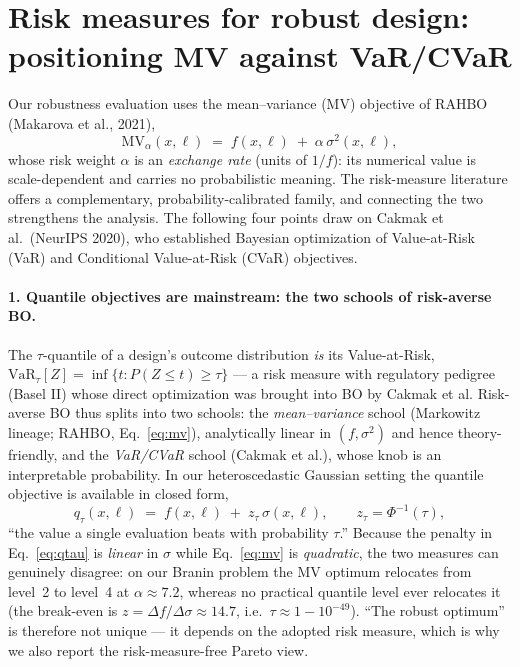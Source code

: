 \section*{Risk measures for robust design: positioning MV against VaR/CVaR}

Our robustness evaluation uses the mean--variance (MV) objective of RAHBO
(Makarova et al., 2021),
\begin{equation}
  \mathrm{MV}_{\alpha}(x,\ell) \;=\; f(x,\ell) \;+\; \alpha\,\sigma^{2}(x,\ell),
  \label{eq:mv}
\end{equation}
whose risk weight $\alpha$ is an \emph{exchange rate} (units of $1/f$): its numerical value is
scale-dependent and carries no probabilistic meaning. The risk-measure literature offers a
complementary, probability-calibrated family, and connecting the two strengthens the analysis.
The following four points draw on Cakmak et al.\ (NeurIPS 2020), who established Bayesian
optimization of Value-at-Risk (VaR) and Conditional Value-at-Risk (CVaR) objectives.

\paragraph{1. Quantile objectives are mainstream: the two schools of risk-averse BO.}
The $\tau$-quantile of a design's outcome distribution \emph{is} its Value-at-Risk,
$\mathrm{VaR}_{\tau}[Z] = \inf\{t : P(Z \le t) \ge \tau\}$ — a risk measure with regulatory
pedigree (Basel II) whose direct optimization was brought into BO by Cakmak et al.
Risk-averse BO thus splits into two schools: the \emph{mean--variance} school
(Markowitz lineage; RAHBO, Eq.~\ref{eq:mv}), analytically linear in $(f,\sigma^{2})$ and hence
theory-friendly, and the \emph{VaR/CVaR} school (Cakmak et al.), whose knob is an interpretable
probability. In our heteroscedastic Gaussian setting the quantile objective is available in
closed form,
\begin{equation}
  q_{\tau}(x,\ell) \;=\; f(x,\ell) \;+\; z_{\tau}\,\sigma(x,\ell),
  \qquad z_{\tau} = \Phi^{-1}(\tau),
  \label{eq:qtau}
\end{equation}
``the value a single evaluation beats with probability $\tau$.'' Because the penalty in
Eq.~\eqref{eq:qtau} is \emph{linear} in $\sigma$ while Eq.~\eqref{eq:mv} is \emph{quadratic},
the two measures can genuinely disagree: on our Branin problem the MV optimum relocates from
level~2 to level~4 at $\alpha \approx 7.2$, whereas no practical quantile level ever relocates it
(the break-even is $z = \Delta f / \Delta\sigma \approx 14.7$, i.e.\ $\tau \approx 1-10^{-49}$).
``The robust optimum'' is therefore not unique — it depends on the adopted risk measure, which is
why we also report the risk-measure-free Pareto view.

